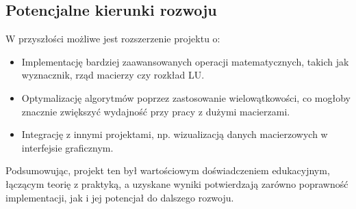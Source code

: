 \subsection{Potencjalne kierunki rozwoju}
W przyszłości możliwe jest rozszerzenie projektu o:
\begin{itemize}
  \item Implementację bardziej zaawansowanych operacji matematycznych, takich jak wyznacznik, rząd macierzy czy rozkład LU.
  \item Optymalizację algorytmów poprzez zastosowanie wielowątkowości, co mogłoby znacznie zwiększyć wydajność przy pracy z dużymi macierzami.
  \item Integrację z innymi projektami, np. wizualizacją danych macierzowych w interfejsie graficznym.
\end{itemize}

Podsumowując, projekt ten był wartościowym doświadczeniem edukacyjnym, łączącym teorię z praktyką, a uzyskane wyniki potwierdzają zarówno poprawność implementacji, jak i jej potencjał do dalszego rozwoju.

\nocite{gitHubCopilot}
